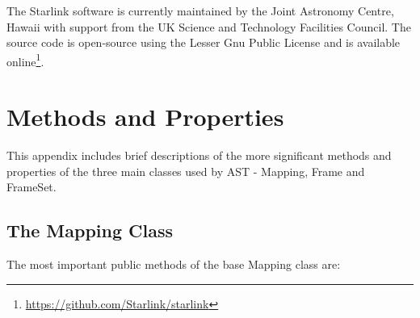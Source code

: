 \documentclass[final,authoryear,5p,times,twocolumn]{elsarticle}
\begin{document}
The Starlink software is currently maintained by the Joint Astronomy
Centre, Hawaii with support from the UK Science and Technology
Facilities Council. The source code is open-source using the Lesser
Gnu Public License and is available
online\footnote{\url{https://github.com/Starlink/starlink}}.


\appendix

\section{Methods and Properties}
\label{app:classes}

This appendix includes brief descriptions of the more significant methods
and properties of the three main classes used by AST - Mapping, Frame and
FrameSet.

\subsection{The Mapping Class}
The most important public methods of the base Mapping class are:
\end{document}
